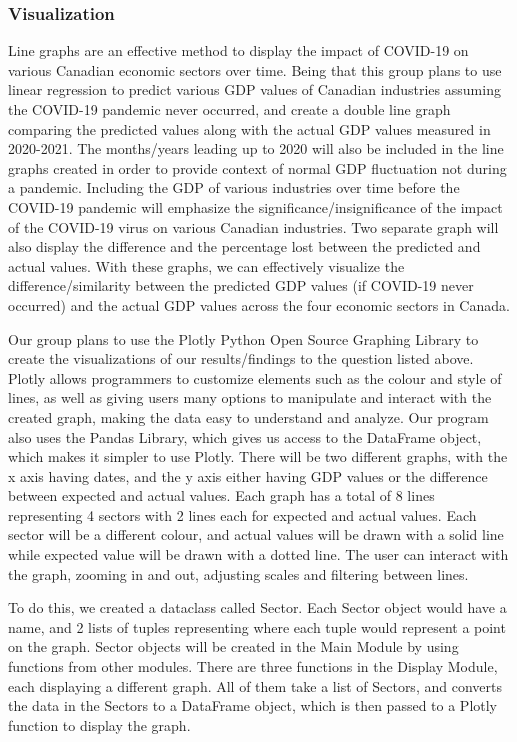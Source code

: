 \documentclass[fontsize=11pt]{article}
\begin{document}
\subsubsection*{Visualization}

Line graphs are an effective method to display the impact of COVID-19 on various Canadian economic sectors over time. Being that this group plans to use linear regression to predict various GDP values of Canadian industries assuming the COVID-19 pandemic never occurred, and create a double line graph comparing the predicted values along with the actual GDP values measured in 2020-2021. 
The months/years leading up to 2020 will also be included in the line graphs created in order to provide context of normal GDP fluctuation not during a pandemic. Including the GDP of various industries over time before the COVID-19 pandemic will emphasize the significance/insignificance of the impact of the COVID-19 virus on various Canadian industries.
Two separate graph will also display the difference and the percentage lost between the predicted and actual values. With these graphs, we can effectively visualize the difference/similarity between the predicted GDP values (if COVID-19 never occurred) and the actual GDP values across the four economic sectors in Canada. 

Our group plans to use the Plotly Python Open Source Graphing Library to create the visualizations of our results/findings to the question listed above. 
Plotly allows programmers to customize elements such as the colour and style of lines, as well as giving users many options to manipulate and interact with the created graph, making the data easy to understand and analyze. 
Our program also uses the Pandas Library, which gives us access to the DataFrame object, which makes it simpler to use Plotly.
There will be two different graphs, with the x axis having dates, and the y axis either having GDP values or the difference between expected and actual values. Each graph has a total of 8 lines representing 4 sectors with 2 lines each for expected and actual values. Each sector will be a different colour, and actual values will be drawn with a solid line while expected value will be drawn with a dotted line. The user can interact with the graph, zooming in and out, adjusting scales and filtering between lines.

To do this, we created a dataclass called Sector. Each Sector object would have a name, and 2 lists of tuples representing where each tuple would represent a point on the graph. Sector objects will be created in the Main Module by using functions from other modules. There are three functions in the Display Module, each displaying a different graph. All of them take a list of Sectors, and converts the data in the Sectors to a DataFrame object, which is then passed to a Plotly function to display the graph.
\end{document}
